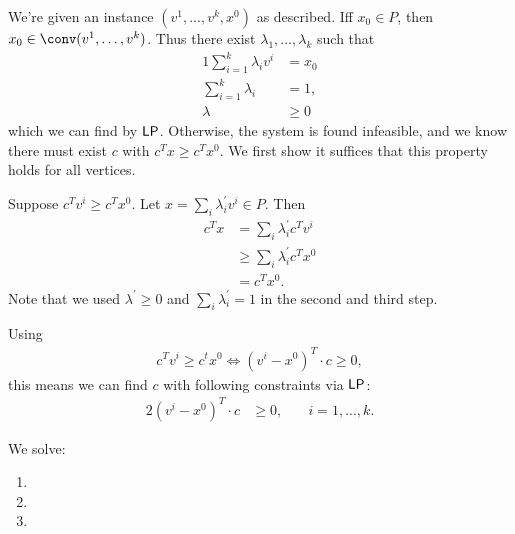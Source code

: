 \begin{aufgabe} \label{ex:4.1}
    We're given an instance $(v^1,...,v^k,x^0)$ as described. Iff $x_0 \in P$,
    then $x_0 \in \conv(v^1,\dots,v^k)$. Thus there exist $\lambda_1,\dots,\lambda_k$ such that
    \begin{alignat*}{1}
        \sum_{i=1}^k\lambda_i v^i & = x_0  \\
        \sum_{i=1}^k\lambda_i     & =1,    \\
        \lambda                   & \geq 0
    \end{alignat*}
    which we can find by $\mathsf{LP}$. Otherwise, the system is found infeasible, and we know there must
    exist $c$ with $c^Tx \geq c^Tx^0$. We first show it suffices that this property holds for all vertices.

    Suppose $c^Tv^i \geq c^Tx^0$. Let $x = \sum_i \lambda^\prime_i v^i \in P$. Then
    \begin{align*}
        c^Tx & = \sum_i \lambda^\prime_i c^T v^i   \\
             & \geq \sum_i \lambda^\prime_i c^Tx^0 \\
             & = c^Tx^0.
    \end{align*}
    Note that we used $\lambda^\prime \geq 0$ and $\sum_i \lambda^\prime_i =1$ in the second and third step.

    Using
    \begin{align*}
        c^Tv^i \geq c^tx^0 \Leftrightarrow (v^i - x^0)^T \cdot c \geq 0,
    \end{align*}
    this means we can find $c$ with following constraints via $\mathsf{LP}$:
    \begin{alignat*}{2}
        (v^i - x^0)^T \cdot c & \geq 0, & \quad i = 1,...,k.
    \end{alignat*}
\end{aufgabe}
\begin{aufgabe}
    We solve:
    \begin{enumerate}
        \item
        \item
        \item
    \end{enumerate}
\end{aufgabe}
